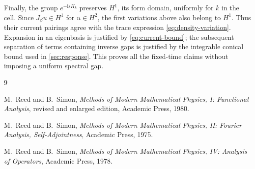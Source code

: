 \documentclass[11pt,a4paper]{article}
\newcommand{\ii}{\mathrm i}
\theoremstyle{remark}
\numberwithin{equation}{section}
\begin{document}
Finally, the group $e^{-\ii sH_k}$ preserves $H^1$, its form domain,
uniformly for $k$ in the cell. Since $J_\beta u\in H^1$ for
$u\in H^2$, the first variations above also belong to $H^1$.
Thus their current pairings agree with the trace expression
\eqref{eq:density-variation}. Expansion in an eigenbasis is justified
by \eqref{eq:current-bound}; the subsequent separation of terms
containing inverse gaps is justified by the integrable conical
bound used in \cref{sec:response}. This proves all the fixed-time
claims without imposing a uniform spectral gap.

\begin{thebibliography}{9}

M.~Reed and B.~Simon,
\emph{Methods of Modern Mathematical Physics, I: Functional Analysis},
revised and enlarged edition, Academic Press, 1980.

M.~Reed and B.~Simon,
\emph{Methods of Modern Mathematical Physics, II: Fourier Analysis,
Self-Adjointness}, Academic Press, 1975.

M.~Reed and B.~Simon,
\emph{Methods of Modern Mathematical Physics, IV: Analysis of Operators},
Academic Press, 1978.

\end{thebibliography}
\end{document}
